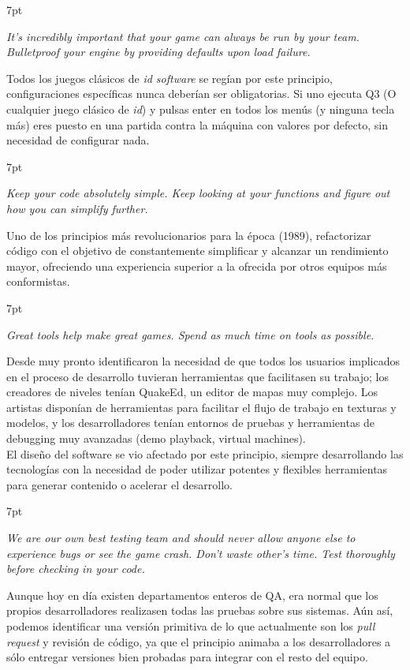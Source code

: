 \documentclass[a4paper,12pt]{report}
\newenvironment{formal}{%
	\def\FrameCommand{%
		\hspace{1pt}%
		{\color{darkblue}\vrule width 2pt}%
		{\color{formalshade}\vrule width 4pt}%
		\colorbox{formalshade}%
	}%
	\MakeFramed{\advance\hsize-\width\FrameRestore}%
	\noindent\hspace{-4.55pt}%
	\begin{adjustwidth}{}{7pt}%
		\vspace{2pt}\vspace{2pt}%
	}
	{%
		\vspace{2pt}\end{adjustwidth}\endMakeFramed%
}
\begin{document}
	\begin{formal}
		\textit{ It's incredibly important that your game can always be run by your team. Bulletproof your engine by providing defaults upon load failure.}
	\end{formal}
	Todos los juegos clásicos de \textit{id software} se regían por este principio, configuraciones específicas nunca deberían ser obligatorias. Si uno ejecuta Q3 (O cualquier juego clásico de \textit{id}) y pulsas enter en todos los menús (y ninguna tecla más) eres puesto en una partida contra la máquina con valores por defecto, sin necesidad de configurar nada.
	
	\begin{formal}
		\textit{Keep your code absolutely simple. Keep looking at your functions and figure out how you can simplify further.}
	\end{formal}
	Uno de los principios más revolucionarios para la época (1989), refactorizar código con el objetivo de constantemente simplificar y alcanzar un rendimiento mayor, ofreciendo una experiencia superior a la ofrecida por otros equipos más conformistas.
	
	\begin{formal}
		\textit{Great tools help make great games. Spend as much time on tools as possible.}      
	\end{formal}
	Desde muy pronto identificaron la necesidad de que todos los usuarios implicados en el proceso de desarrollo tuvieran herramientas que facilitasen su trabajo; los creadores de niveles tenían QuakeEd, un editor de mapas muy complejo. Los artistas disponían de herramientas para facilitar el flujo de trabajo en texturas y modelos, y los desarrolladores tenían entornos de pruebas y herramientas de debugging muy avanzadas (demo playback, virtual machines).\\
	El diseño del software se vio afectado por este principio, siempre desarrollando las tecnologías con la necesidad de poder utilizar potentes y flexibles herramientas para generar contenido o acelerar el desarrollo.
	
	\begin{formal}
		\textit{We are our own best testing team and should never allow anyone else to experience bugs or see the game crash. Don't waste other's time. Test thoroughly before checking in your code.}        
	\end{formal}
	Aunque hoy en día existen departamentos enteros de QA, era normal que los propios desarrolladores realizasen todas las pruebas sobre sus sistemas. Aún así, podemos identificar una versión primitiva de lo que actualmente son los \textit{pull request} y revisión de código, ya que el principio animaba a los desarrolladores a sólo entregar versiones bien probadas para integrar con el resto del equipo.
	
\end{document}
